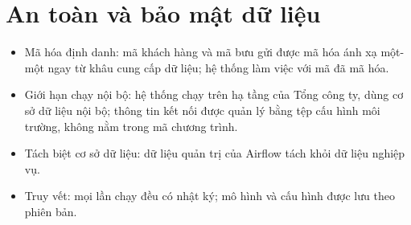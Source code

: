 \section{An toàn và bảo mật dữ liệu}

\begin{itemize}
  \item Mã hóa định danh: mã khách hàng và mã bưu gửi được mã hóa ánh xạ một-một ngay từ khâu cung cấp dữ liệu; hệ thống làm việc với mã đã mã hóa.
  \item Giới hạn chạy nội bộ: hệ thống chạy trên hạ tầng của Tổng công ty, dùng cơ sở dữ liệu nội bộ; thông tin kết nối được quản lý bằng tệp cấu hình môi trường, không nằm trong mã chương trình.
  \item Tách biệt cơ sở dữ liệu: dữ liệu quản trị của Airflow tách khỏi dữ liệu nghiệp vụ.
  \item Truy vết: mọi lần chạy đều có nhật ký; mô hình và cấu hình được lưu theo phiên bản.
\end{itemize}